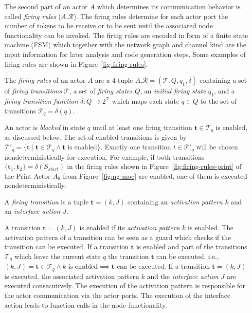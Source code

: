 The second part of an actor $A$ which determines its communication
behavior is called \emph{firing rules} ($A.\mathcal{R}$). The firing rules
determine for each actor port the number of tokens to be receive or to be sent
until the associated node functionality can be invoked.
The firing rules are encoded in form of a finite state machine (FSM)
which together with the network graph and channel kind are
the input information for later analysis and code generation steps.
Some examples of firing rules are shown in Figure~\ref{fig:firing-rules}.

\begin{sdefinition}\label{firing-rules}
  The \emph{firing rules} of an actor $A$ are a 4-tuple $A.\mathcal{R} = (\mathcal{T}, Q, q_1, \delta)$
  containing a set of \emph{firing transitions} $\mathcal{T}$,  a set of \emph{firing states} $Q$,
  an \emph{initial firing state} $q_1$, and a \emph{firing transition function} $\delta: Q \to 2^\mathcal{T}$
  which maps each state $q \in Q$ to the set of transitions
  $\mathcal{T}_q = \delta(q)$.
\end{sdefinition}

An actor is \emph{blocked} in state $q$ until at least one firing transition
$\mathbf{t} \in \mathcal{T}_q$ is enabled, as discussed below. The set of enabled transitions is
given by $\mathcal{T}'_q = \{ \mathbf{t} \mid \mathbf{t} \in \mathcal{T}_q \wedge \mathbf{t} \textrm{ is enabled}\}$.
Exactly one transition $t \in \mathcal{T}'_q$ will be chosen nondeterministically
for execution. For example, if both transitions $\{\mathbf{t}_1, \mathbf{t}_2\} = \delta(S_{start})$
in the firing rules shown in Figure~\ref{fig:firing-rules-print} of the Print Actor $A_6$ from Figure~\ref{fig:ng-moc}
are enabled, one of them is executed nondeterministically.

\begin{sdefinition}\label{firing-transition}
  A \emph{firing transition} is a tuple $\mathbf{t} = (k,J)$ containing
  an \emph{activation pattern} $k$ and an \emph{interface action} $J$.
\end{sdefinition}

A transition $\mathbf{t} = (k,J)$ is enabled if its \emph{activation pattern} $k$
is enabled. The activation pattern of a transition can be seen as
a guard which checks if the transition can be executed.
If a transition $\mathbf{t}$ is enabled and 
part of the transitions $\mathcal{T}_q$ which leave the current state $q$
the transition $\mathbf{t}$ can be executed, i.e.,
$(k,J) = \mathbf{t} \in \mathcal{T}_q \wedge k\textrm{ is enabled} \implies \mathbf{t}\textrm{ can be executed}$.
If a transition $\mathbf{t} = (k,J)$ is executed, the associated
activation pattern $k$ and the \emph{interface action} $J$ are executed consecutively.
The execution of the activation pattern is responsible for the
actor communication via the actor ports. The execution of the
interface action leads to function calls in the node functionality.

